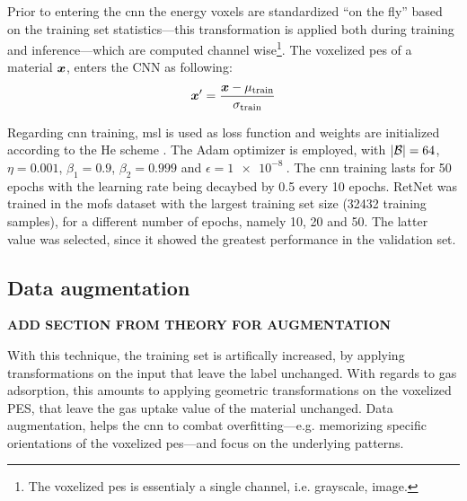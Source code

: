 Prior to entering the \gls{cnn} the energy voxels are standardized ``on the
fly'' based on the training set statistics---this transformation is applied both
during training and inference---which are computed channel wise\footnote{The
voxelized \gls{pes} is essentialy a single channel, i.e. grayscale,
image.}. The voxelized \gls{pes} of a material $\boldsymbol{x}$,
enters the CNN as following:
\begin{equation}
	\boldsymbol{x}' = \frac{\boldsymbol{x} - \mu_\text{train}}{\sigma_\text{train}}
\end{equation}

Regarding \gls{cnn} training, \gls{msl} is used as loss
function and weights are initialized according to the He
scheme \parencite{He2015}. The Adam optimizer \parencite{Kingma2017} is
employed, with $\lvert\mathcal{B}\rvert = 64$, $\eta = 0.001$, $\beta_1 = 0.9$,
$\beta_2 = 0.999$ and $\epsilon = \SI{1e-8}{}$. The \gls{cnn} training lasts for
\num{50} epochs with the learning rate being decaybed by \num{0.5} every
\num{10} epochs. RetNet was trained in the \glspl{mof} dataset
with the largest training set size (\num{32432} training samples), for a
different number of epochs, namely \num{10}, \num{20} and \num{50}. The latter
value was selected, since it showed the greatest performance in the validation
set.

\subsection{Data augmentation}
\label{subsec:data_augmentation}

\textbf{ADD SECTION FROM THEORY FOR AUGMENTATION}

With this technique, the training set is artifically
increased, by applying transformations on the
input that leave the label unchanged. With regards to gas
adsorption, this amounts to applying geometric transformations on the voxelized
PES, that leave the gas uptake value of the material unchanged. Data
augmentation, helps the \gls{cnn} to combat
overfitting---e.g. memorizing specific orientations of the
voxelized \gls{pes}---and focus on the underlying patterns.

